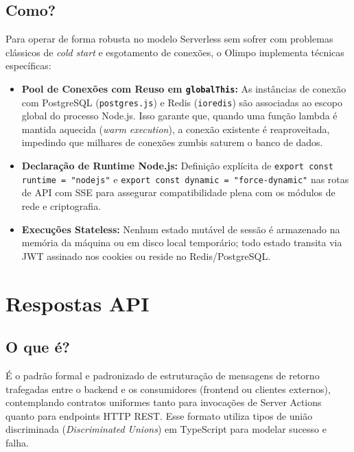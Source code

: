 \documentclass[12pt,a4paper]{article}
\begin{document}
\subsection{Como?}
Para operar de forma robusta no modelo Serverless sem sofrer com problemas clássicos de \textit{cold start} e esgotamento de conexões, o Olimpo implementa técnicas específicas:
\begin{itemize}
  \item \textbf{Pool de Conexões com Reuso em \texttt{globalThis}:} As instâncias de conexão com PostgreSQL (\texttt{postgres.js}) e Redis (\texttt{ioredis}) são associadas ao escopo global do processo Node.js. Isso garante que, quando uma função lambda é mantida aquecida (\textit{warm execution}), a conexão existente é reaproveitada, impedindo que milhares de conexões zumbis saturem o banco de dados.
  \item \textbf{Declaração de Runtime Node.js:} Definição explícita de \texttt{export const runtime = "nodejs"} e \texttt{export const dynamic = "force-dynamic"} nas rotas de API com SSE para assegurar compatibilidade plena com os módulos de rede e criptografia.
  \item \textbf{Execuções Stateless:} Nenhum estado mutável de sessão é armazenado na memória da máquina ou em disco local temporário; todo estado transita via JWT assinado nos cookies ou reside no Redis/PostgreSQL.
\end{itemize}

\section{Respostas API}

\subsection{O que é?}
É o padrão formal e padronizado de estruturação de mensagens de retorno trafegadas entre o backend e os consumidores (frontend ou clientes externos), contemplando contratos uniformes tanto para invocações de Server Actions quanto para endpoints HTTP REST. Esse formato utiliza tipos de união discriminada (\textit{Discriminated Unions}) em TypeScript para modelar sucesso e falha.
\end{document}
